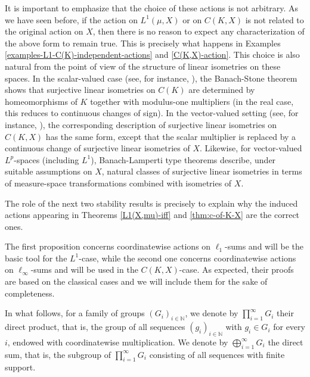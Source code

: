 \documentclass[a4paper,12pt]{amsart}
\theoremstyle{definition}
\theoremstyle{definition}
\theoremstyle{remark}
\numberwithin{equation}{section}
\newcommand{\N}{\mathbb{N}}
\newcommand{\<}{\langle}
\renewcommand{\>}{\rangle}
\begin{document}
	
	It is important to emphasize that the choice of these actions is not arbitrary. As we have seen before, if the action on $L^1(\mu,X)$ or on $C(K,X)$ is not related to the original action on $X$, then there is no reason to expect any characterization of the above form to remain true. This is precisely what happens in Examples \ref{examples-L1-C(K)-independent-actions} and \ref{C(K,X)-action}. This choice is also natural from the point of view of the structure of linear isometries on these spaces. In the scalar-valued case (see, for instance, \cite{FlemingJamison2003}), the Banach-Stone theorem shows that surjective linear isometries on $C(K)$ are determined by homeomorphisms of $K$ together with modulus-one multipliers (in the real case, this reduces to continuous changes of sign). In the vector-valued setting (see, for instance, \cite{ FlemingJamison2007}), the corresponding description of surjective linear isometries on $C(K,X)$ has the same form, except that the scalar multiplier is replaced by a continuous change of surjective linear isometries of $X$. Likewise, for vector-valued $L^p$-spaces (including $L^1$), Banach-Lamperti type theorems describe, under suitable assumptions on $X$, natural classes of surjective linear isometries in terms of measure-space transformations combined with isometries of $X$. 
	
	The role of the next two stability results is precisely to explain why the induced actions appearing in Theorems \ref{L1(X,mu)-iff} and \ref{thm:c-of-K-X} are the correct ones.
	
	The first proposition concerns coordinatewise actions on $\ell_1$-sums and will be the basic tool for the $L^1$-case, while the second one concerns coordinatewise actions on $\ell_\infty$-sums and will be used in the $C(K,X)$-case. As expected, their proofs are based on the classical cases and we will include them for the sake of completeness. 
	
	In what follows, for a family of groups $(G_i)_{i\in\N}$, we denote by $\prod_{i=1}^\infty G_i$ their direct product, that is, the group of all sequences $(g_i)_{i\in\mathbb N}$ with $g_i\in G_i$ for every $i$, endowed with coordinatewise multiplication. We denote by $\bigoplus_{i=1}^\infty G_i$ the direct sum, that is, the subgroup of $\prod_{i=1}^\infty G_i$ consisting of all sequences with finite support.
	
\end{document}

